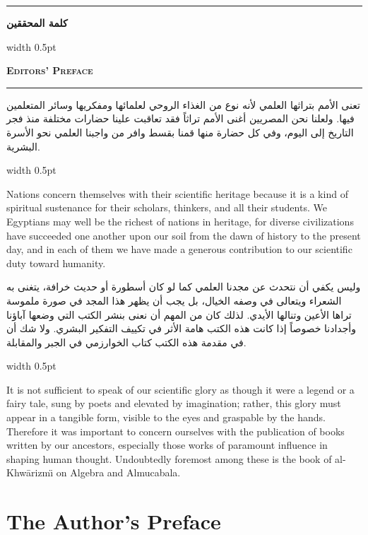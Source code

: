 \documentclass[10pt,a4paper]{book}
\newlength{\colwidth}
\newcommand{\bilingualpair}[2]{%
  \noindent
  \begin{minipage}[t]{\colwidth}
  \begin{flushright}
  \vspace{0pt}
  {\arabicfont\small #1}
  \end{flushright}
  \end{minipage}%
  \hfill\textcolor{columnsepclr}{\vrule width 0.5pt}\hfill
  \begin{minipage}[t]{\colwidth}
  \vspace{0pt}
  {\small #2}
  \end{minipage}%
  \par\vspace{0.6em}
}
\newcommand{\bilingualsectionheader}[2]{%
  \par\vspace{0.8em}
  \noindent
  \begin{minipage}[t]{\colwidth}
  \begin{flushright}
  \textbf{\arabicfont #1}
  \end{flushright}
  \end{minipage}%
  \hfill\textcolor{columnsepclr}{\vrule width 0.5pt}\hfill
  \begin{minipage}[t]{\colwidth}
  \textbf{\textsc{#2}}
  \end{minipage}%
  \par\vspace{0.5em}
}
\begin{document}
\noindent\textcolor{columnsepclr}{\rule{\textwidth}{0.6pt}}\par\vspace{0.3em}
\bilingualsectionheader{كلمة المحققين}{Editors' Preface}
\noindent\textcolor{columnsepclr}{\rule{\textwidth}{0.6pt}}\par\vspace{0.5em}

\bilingualpair{
تعنى الأمم بتراثها العلمي لأنه نوع من الغذاء الروحي لعلمائها ومفكريها
وسائر المتعلمين فيها. ولعلنا نحن المصريين أغنى الأمم تراثاً فقد تعاقبت
علينا حضارات مختلفة منذ فجر التاريخ إلى اليوم، وفي كل حضارة منها قمنا
بقسط وافر من واجبنا العلمي نحو الأسرة البشرية.
}{
Nations concern themselves with their scientific heritage because it is a kind
of spiritual sustenance for their scholars, thinkers, and all their students.
We Egyptians may well be the richest of nations in heritage, for diverse
civilizations have succeeded one another upon our soil from the dawn of
history to the present day, and in each of them we have made a generous
contribution to our scientific duty toward humanity.
}

\bilingualpair{
وليس يكفي أن نتحدث عن مجدنا العلمي كما لو كان أسطورة أو حديث خرافة،
يتغنى به الشعراء ويتعالى في وصفه الخيال، بل يجب أن يظهر هذا المجد في
صورة ملموسة تراها الأعين وتنالها الأيدي. لذلك كان من المهم أن نعنى
بنشر الكتب التي وضعها آباؤنا وأجدادنا خصوصاً إذا كانت هذه الكتب
هامة الأثر في تكييف التفكير البشري. ولا شك أن في مقدمة هذه الكتب
كتاب الخوارزمي في الجبر والمقابلة.
}{
It is not sufficient to speak of our scientific glory as though it were a
legend or a fairy tale, sung by poets and elevated by imagination; rather,
this glory must appear in a tangible form, visible to the eyes and graspable
by the hands. Therefore it was important to concern ourselves with the
publication of books written by our ancestors, especially those works of
paramount influence in shaping human thought. Undoubtedly foremost among
these is the book of al-Khw\=arizm\"{\i} on Algebra and Almucabala.
}

\newpage

\chapter*{The Author's Preface}
\end{document}
